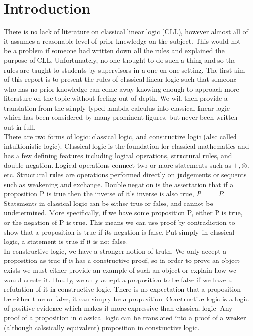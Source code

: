 \chapter{Introduction}
\label{chap: intro}


\noindent
There is no lack of literature on classical linear logic (CLL), however almost all of it assumes a reasonable 
level of prior knowledge on the subject. This would not be a problem if someone had written down all the 
rules and explained the purpose of CLL. Unfortunately, no one thought to do such a thing and so the rules 
are taught to students by supervisors in a one-on-one setting. The first aim of this report is to present 
the rules of classical linear logic such that someone who has no prior knowledge can come away knowing 
enough to approach more literature on the topic without feeling out of depth. We will then provide a 
translation from the simply typed lambda calculus into classical linear logic which has been considered 
by many prominent figures, but never been written out in full. \\

\noindent
There are two forms of logic: classical logic, and constructive logic (also called intuitionistic logic). 
Classical logic is the foundation for classical mathematics and has a few defining features including 
logical operations, structural rules, and double negation. Logical operations connect two or more statements 
such as $+, \otimes$, etc. Structural rules are operations performed directly on judgements or sequents such 
as weakening and exchange. Double negation is the assertation that if a proposition P is true then the inverse 
of it's inverse is also true, $P = \neg \neg P$. Statements in classical logic can be either 
true or false, and cannot be undetermined. More specifically, if we have some proposition P, either P is 
true, or the negation of P is true. This means we can use proof by contradiction to show that a proposition 
is true if its negation is false. Put simply, in classical logic, a statement is true if it is not false. \\

\noindent
In constructive logic, we have a stronger notion of truth. We only accept a proposition as true if it has a 
constructive proof, so in order to prove an object exists we must either provide an example of such an object or 
explain how we would create it. Dually, we only accept a proposition to be false if we have a refutation of it in 
constructive logic. There is no expectation that a proposition be either true or false, it can simply be a proposition. 
Constructive logic is a logic of positive evidence which makes it more expressive than classical logic. Any 
proof of a proposition in classical logic can be translated into a proof of a weaker (although calssically 
equivalent) proposition in constructive logic. \\

